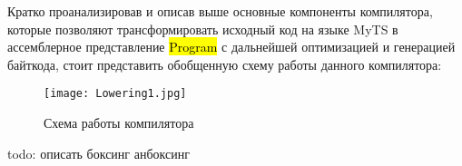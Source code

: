 Кратко проанализировав и описав выше основные компоненты компилятора, которые позволяют трансформировать исходный код на
языке MyTS в ассемблерное представление \hl{Program} с дальнейшей оптимизацией и генерацией байткода,
стоит представить обобщенную схему работы данного компилятора:

\begin{figure}[h]
    \centering
    \texttt{[image: Lowering1.jpg]}
    \caption{Схема работы компилятора}\label{fig:figure}
\end{figure}

todo: описать боксинг анбоксинг

\newpage
